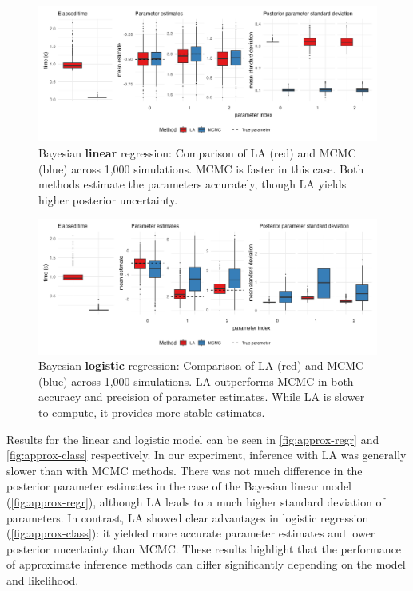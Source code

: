 \begin{figure}[htbp]
    \centering
    \includegraphics[width=\linewidth]{../figures/approx_regr.png}
    \caption{
    Bayesian \textbf{linear} regression: Comparison of LA (red) and MCMC (blue) across 1,000 simulations.
    MCMC is faster in this case.
    Both methods estimate the parameters accurately, though LA yields higher posterior uncertainty.
    }
    \label{fig:approx-regr}
\end{figure}

\begin{figure}[htbp]
    \centering
    \includegraphics[width=\linewidth]{../figures/approx_class.png}
    \caption{
    Bayesian \textbf{logistic} regression: Comparison of LA (red) and MCMC (blue) across 1,000 simulations.
    LA outperforms MCMC in both accuracy and precision of parameter estimates.
    While LA is slower to compute, it provides more stable estimates.
    }
    \label{fig:approx-class}
\end{figure}

Results for the linear and logistic model can be seen in \autoref{fig:approx-regr} and \autoref{fig:approx-class} respectively.
In our experiment, inference with LA was generally slower than with MCMC methods.
There was not much difference in the posterior parameter estimates in the case of the Bayesian linear model (\autoref{fig:approx-regr}), although LA leads to a much higher standard deviation of parameters.
In contrast, LA showed clear advantages in logistic regression (\autoref{fig:approx-class}): it yielded more accurate parameter estimates and lower posterior uncertainty than MCMC.
These results highlight that the performance of approximate inference methods can differ significantly depending on the model and likelihood.


